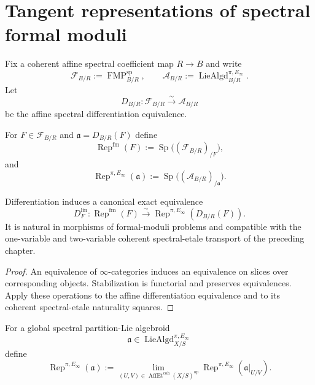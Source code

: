 \section{Tangent representations of spectral formal moduli}
\label{sec:as-tangent-representations}

Fix a coherent affine spectral coefficient map $R\to B$ and write
\[
    \mathcal F_{B/R}
    :=
    \operatorname{FMP}^{\mathrm{sp}}_{B/R},
    \qquad
    \mathcal A_{B/R}
    :=
    \operatorname{LieAlgd}^{\pi,E_\infty}_{B/R}.
\]
Let
\[
    D_{B/R}:
    \mathcal F_{B/R}
    \xrightarrow{\sim}
    \mathcal A_{B/R}
\]
be the affine spectral differentiation equivalence.

\begin{definition}
\label{def:as-representation-categories}
For $F\in\mathcal F_{B/R}$ and $\mathfrak a=D_{B/R}(F)$ define
\[
\boxed{
    \operatorname{Rep}^{\mathrm{fm}}(F)
    :=
    \operatorname{Sp}
    \bigl((\mathcal F_{B/R})_{/F}\bigr),
}
\]
and
\[
\boxed{
    \operatorname{Rep}^{\pi,E_\infty}(\mathfrak a)
    :=
    \operatorname{Sp}
    \bigl((\mathcal A_{B/R})_{/\mathfrak a}\bigr).
}
\]
\end{definition}

\begin{theorem}
\label{thm:as-tangent-differentiation}
Differentiation induces a canonical exact equivalence
\[
\boxed{
    D_F^{\mathrm{lin}}:
    \operatorname{Rep}^{\mathrm{fm}}(F)
    \xrightarrow{\sim}
    \operatorname{Rep}^{\pi,E_\infty}
    \left(D_{B/R}(F)\right).
}
\]
It is natural in morphisms of formal-moduli problems and compatible with the
one-variable and two-variable coherent spectral-etale transport of the
preceding chapter.
\end{theorem}

\begin{proof}
An equivalence of $\infty$-categories induces an equivalence on slices over
corresponding objects.  Stabilization is functorial and preserves
equivalences.  Apply these operations to the affine differentiation
equivalence and to its coherent spectral-etale naturality squares.
\end{proof}

\begin{definition}
\label{def:as-global-representation-categories}
For a global spectral partition-Lie algebroid
\[
    \mathfrak a
    \in
    \operatorname{LieAlgd}^{\pi,E_\infty}_{X/S}
\]
define
\[
\boxed{
    \operatorname{Rep}^{\pi,E_\infty}(\mathfrak a)
    :=
    \lim_{(U,V)\in
    \operatorname{AffEt}^{\mathrm{coh}}(X/S)^{\mathrm{op}}}
    \operatorname{Rep}^{\pi,E_\infty}
    \left(\mathfrak a|_{U/V}\right).
}
\]
\end{definition}


